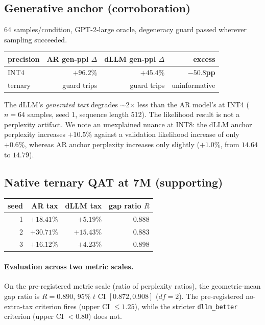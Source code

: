 \documentclass[11pt]{article}
\begin{document}
\subsection{Generative anchor (corroboration)}
\label{sec:anchor}

64 samples/condition, GPT-2-large oracle, degeneracy guard passed wherever sampling succeeded.

\begin{center}
\begin{tabular}{lrrr}
\toprule
precision & AR gen-ppl $\Delta$ & dLLM gen-ppl $\Delta$ & excess \\
\midrule
INT4 & $+96.2\%$ & $+45.4\%$ & $\mathbf{-50.8}$\textbf{pp} \\
ternary & guard trips & guard trips & uninformative \\
\bottomrule
\end{tabular}
\end{center}

The dLLM's \emph{generated text} degrades $\sim$2$\times$ less than the AR model's at INT4 ($n=64$ samples, seed 1, sequence length 512). The likelihood result is not a perplexity artifact. We note an unexplained nuance at INT8: the dLLM anchor perplexity increases $+10.5\%$ against a validation likelihood increase of only $+0.6\%$, whereas AR anchor perplexity increases only slightly ($+1.0\%$, from $14.64$ to $14.79$).

\subsection{Native ternary QAT at 7M (supporting)}
\label{sec:qat}

\begin{center}
\begin{tabular}{rrrr}
\toprule
seed & AR tax & dLLM tax & gap ratio $R$ \\
\midrule
1 & $+18.41\%$ & $+5.19\%$ & 0.888 \\
2 & $+30.71\%$ & $+15.43\%$ & 0.883 \\
3 & $+16.12\%$ & $+4.23\%$ & 0.898 \\
\bottomrule
\end{tabular}
\end{center}

\paragraph{Evaluation across two metric scales.} On the pre-registered metric scale (ratio of perplexity ratios), the geometric-mean gap ratio is $R = 0.890$, 95\% $t$ CI $[0.872, 0.908]$ ($df=2$). The pre-registered no-extra-tax criterion fires (upper CI $\le 1.25$), while the stricter \texttt{dllm\_better} criterion (upper CI $< 0.80$) does not.
\end{document}
